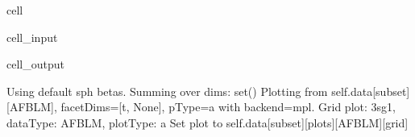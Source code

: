 \documentclass[letterpaper,table,10pt,english]{jupyterBook}
\begin{document}
\begin{sphinxuseclass}{cell}\begin{sphinxVerbatimInput}

\begin{sphinxuseclass}{cell_input}
\begin{sphinxVerbatim}[commandchars=\\\{\}]
    
     
                  
               
\end{sphinxVerbatim}

\end{sphinxuseclass}\end{sphinxVerbatimInput}
\begin{sphinxVerbatimOutput}

\begin{sphinxuseclass}{cell_output}
\begin{sphinxVerbatim}[commandchars=\\\{\}]
Using default sph betas.
Summing over dims: set()
Plotting from self.data[subset][AFBLM], facetDims=[\PYGZsq{}t\PYGZsq{}, None], pType=a with backend=mpl.
Grid plot: 3sg\PYGZhy{}1, dataType: AFBLM, plotType: a
Set plot to self.data[\PYGZsq{}subset\PYGZsq{}][\PYGZsq{}plots\PYGZsq{}][\PYGZsq{}AFBLM\PYGZsq{}][\PYGZsq{}grid\PYGZsq{}]
\end{sphinxVerbatim}

\noindent{}

\end{sphinxuseclass}\end{sphinxVerbatimOutput}

\end{sphinxuseclass}
\end{document}
